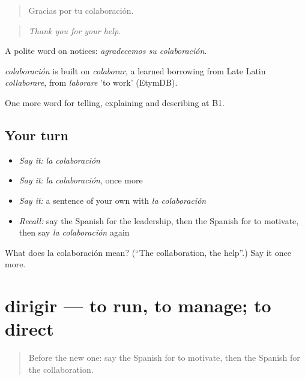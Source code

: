 \begin{quote}
Gracias por tu colaboración.
\end{quote}

\begin{quote}
\emph{Thank you for your help.}
\end{quote}

A polite word on notices: \emph{agradecemos su colaboración}.

\begin{cousinweb}
\emph{colaboración} is built on \emph{colaborar}, a learned borrowing from Late Latin \emph{collaborare}, from \emph{laborare} 'to work' (EtymDB).
\end{cousinweb}

\begin{grammarlens}[title={What you've built}]
One more word for telling, explaining and describing at B1.
\end{grammarlens}

\subsection*{Your turn}
\begin{itemize}
\raggedright
  \item \emph{Say it:} \emph{la colaboración}
  \item \emph{Say it:} \emph{la colaboración}, once more
  \item \emph{Say it:} a sentence of your own with \emph{la colaboración}
  \item \emph{Recall:} say the Spanish for the leadership, then the Spanish for to motivate, then say \emph{la colaboración} again
\end{itemize}

\begin{tcolorbox}[breakable,colback=teal!4,colframe=teal!35!black,title={Before you move on}]
What does la colaboración mean? (\textquotedblleft{}The collaboration, the help\textquotedblright{}.) Say it once more.
\end{tcolorbox}
\section[dirigir]{dirigir — to run, to manage; to direct}

\label{lesson:ES-C594-dirigir}



\begin{quote}
Before the new one: say the Spanish for to motivate, then the Spanish for the collaboration.
\end{quote}

